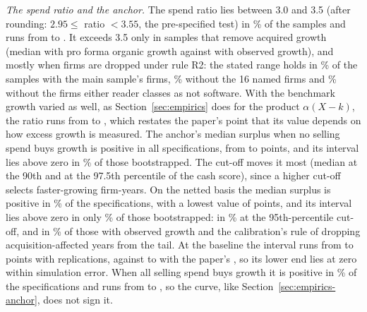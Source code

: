 \emph{The spend ratio and the anchor.} The spend ratio lies between 3.0 and 3.5 (after rounding: $2.95\le$ ratio $<3.55$, the pre-specified test) in \ScSpendShare\% of the \ScSpendN{} samples and runs from \ScSpendMin{} to \ScSpendMax. It exceeds 3.5 only in samples that remove acquired growth (median \ScSpendProMed{} with pro forma organic growth against \ScSpendObsMed{} with observed growth), and mostly when firms are dropped under rule R2: the stated range holds in \ScSpendRtwoMainShare\% of the samples with the main sample's firms, \ScSpendRtwoNamedShare\% without the 16 named firms and \ScSpendRtwoEitherShare\% without the firms either reader classes as not software. With the benchmark growth varied as well, as Section~\ref{sec:empirics} does for the product $\alpha(X-k)$, the ratio runs from \ScSpendBenchMin{} to \ScSpendBenchMax, which restates the paper's point that its value depends on how excess growth is measured. The anchor's median surplus when no selling spend buys growth is positive in all \ScAncLbN{} specifications, from \ScAncLbMin{} to \ScAncLbMax{} points, and its interval lies above zero in \ScAncLbBootShare\% of those bootstrapped. The cut-off moves it most (median \ScAncLbCutNinetyMed{} at the 90th and \ScAncLbCutNinetySevenFiveMed{} at the 97.5th percentile of the cash score), since a higher cut-off selects faster-growing firm-years. On the netted basis the median surplus is positive in \ScAncNetShare\% of the specifications, with a lowest value of \ScAncNetMin{} points, and its interval lies above zero in only \ScAncNetBootShare\% of those bootstrapped: in \ScAncNetBootCutShare\% at the 95th-percentile cut-off, and in \ScAncNetBootObsDropShare\% of those with observed growth and the calibration's rule of dropping acquisition-affected years from the tail. At the baseline the interval runs from \ScAncNetBootBaseLo{} to \ScAncNetBootBaseHi{} points with \ScBootB{} replications, against \AncPiNetEoneLo{} to \AncPiNetEoneHi{} with the paper's \BootB, so its lower end lies at zero within simulation error. When all selling spend buys growth it is positive in \ScAncUbShare\% of the specifications and runs from \ScAncUbMin{} to \ScAncUbMax, so the curve, like Section~\ref{sec:empirics-anchor}, does not sign it.

